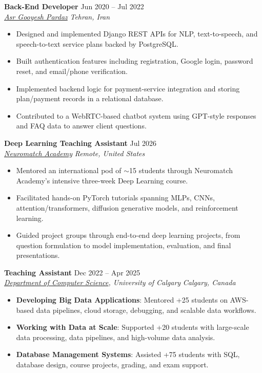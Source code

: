 \documentclass[a4paper,10pt]{article}
\newcommand{\resumeSubheading}[4]{
    \textbf{#1} \hfill #2 \\
    \textit{#3} \hfill \textit{#4}
}
\begin{document}
\resumeSubheading
{Back-End Developer}
{Jun 2020 -- Jul 2022}
{\href{https://asr-gooyesh.com/en/}{Asr Gooyesh Pardaz}}
{Tehran, Iran}
\begin{itemize}[leftmargin=0.25in]
    \item Designed and implemented Django REST APIs for NLP, text-to-speech, and speech-to-text service plans backed by PostgreSQL.
    \item Built authentication features including registration, Google login, password reset, and email/phone verification.
    \item Implemented backend logic for payment-service integration and storing plan/payment records in a relational database.
    \item Contributed to a WebRTC-based chatbot system using GPT-style responses and FAQ data to answer client questions.
\end{itemize}

\resumeSubheading
{Deep Learning Teaching Assistant}
{Jul 2026}
{\href{https://neuromatch.io/}{Neuromatch Academy}}
{Remote, United States}
\begin{itemize}[leftmargin=0.25in]
    \item Mentored an international pod of $\sim$15 students through Neuromatch Academy's intensive three-week Deep Learning course.
    \item Facilitated hands-on PyTorch tutorials spanning MLPs, CNNs, attention/transformers, diffusion generative models, and reinforcement learning.
    \item Guided project groups through end-to-end deep learning projects, from question formulation to model implementation, evaluation, and final presentations.
\end{itemize}

\resumeSubheading
{Teaching Assistant}
{Dec 2022 -- Apr 2025}
{\href{https://science.ucalgary.ca/computer-science} {Department of Computer Science}, University of Calgary}
{Calgary, Canada}
\begin{itemize}[leftmargin=0.25in]
    \item \textbf{Developing Big Data Applications}: Mentored +25 students on AWS-based data pipelines, cloud storage, debugging, and scalable data workflows. 
    \item \textbf{Working with Data at Scale}: Supported +20 students with large-scale data processing, data pipelines, and high-volume data analysis. 
    \item \textbf{Database Management Systems}: Assisted +75 students with SQL, database design, course projects, grading, and exam support.
\end{itemize}
\end{document}
